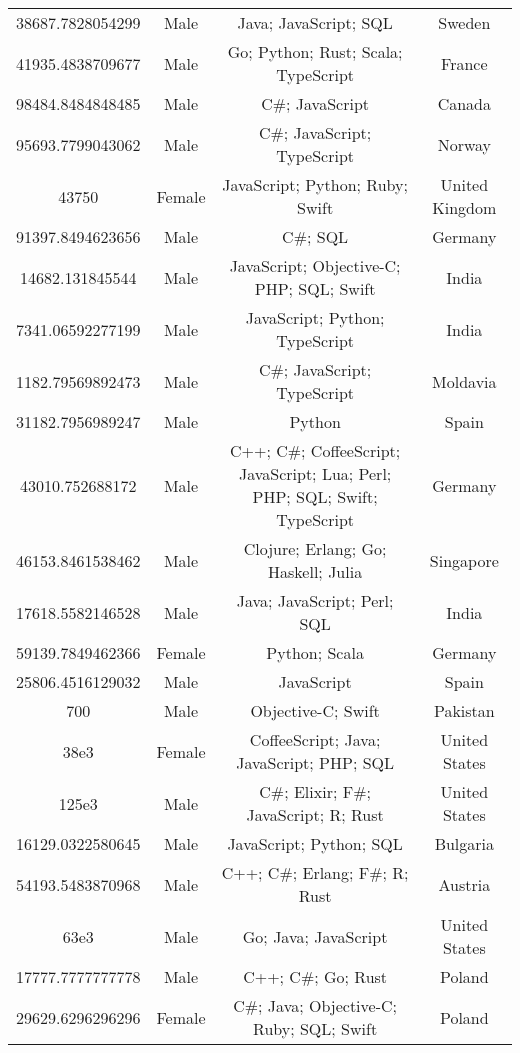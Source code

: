 \begin{center}
\begin{tabular}{ |c|c|c|c| }
38687.7828054299  &  Male  &  Java; JavaScript; SQL  &  Sweden  \\ 
41935.4838709677  &  Male  &  Go; Python; Rust; Scala; TypeScript  &  France  \\ 
98484.8484848485  &  Male  &  C\#; JavaScript  &  Canada  \\ 
95693.7799043062  &  Male  &  C\#; JavaScript; TypeScript  &  Norway  \\ 
43750  &  Female  &  JavaScript; Python; Ruby; Swift  &  United Kingdom  \\ 
91397.8494623656  &  Male  &  C\#; SQL  &  Germany  \\ 
14682.131845544  &  Male  &  JavaScript; Objective-C; PHP; SQL; Swift  &  India  \\ 
7341.06592277199  &  Male  &  JavaScript; Python; TypeScript  &  India  \\ 
1182.79569892473  &  Male  &  C\#; JavaScript; TypeScript  &  Moldavia  \\ 
31182.7956989247  &  Male  &  Python  &  Spain  \\ 
43010.752688172  &  Male  &  C++; C\#; CoffeeScript; JavaScript; Lua; Perl; PHP; SQL; Swift; TypeScript  &  Germany  \\ 
46153.8461538462  &  Male  &  Clojure; Erlang; Go; Haskell; Julia  &  Singapore  \\ 
17618.5582146528  &  Male  &  Java; JavaScript; Perl; SQL  &  India  \\ 
59139.7849462366  &  Female  &  Python; Scala  &  Germany  \\ 
25806.4516129032  &  Male  &  JavaScript  &  Spain  \\ 
700  &  Male  &  Objective-C; Swift  &  Pakistan  \\ 
38e3  &  Female  &  CoffeeScript; Java; JavaScript; PHP; SQL  &  United States  \\ 
125e3  &  Male  &  C\#; Elixir; F\#; JavaScript; R; Rust  &  United States  \\ 
16129.0322580645  &  Male  &  JavaScript; Python; SQL  &  Bulgaria  \\ 
54193.5483870968  &  Male  &  C++; C\#; Erlang; F\#; R; Rust  &  Austria  \\ 
63e3  &  Male  &  Go; Java; JavaScript  &  United States  \\ 
17777.7777777778  &  Male  &  C++; C\#; Go; Rust  &  Poland  \\ 
29629.6296296296  &  Female  &  C\#; Java; Objective-C; Ruby; SQL; Swift  &  Poland  \\ 

\end{tabular}
\end{center}
